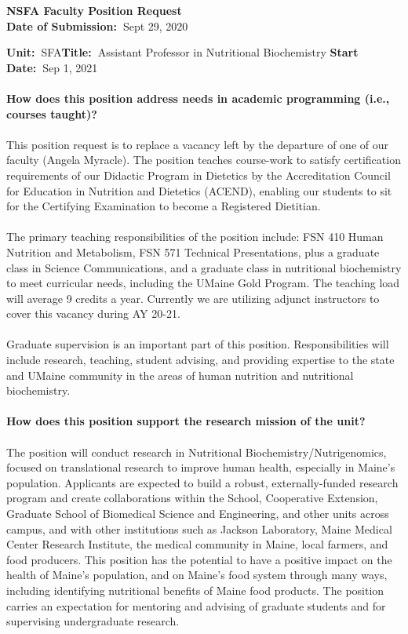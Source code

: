 \documentclass[11pt]{article}
\begin{document}
\sloppy \rmfamily
\begin{center}\textbf{NSFA Faculty Position Request\\Date of Submission:~}Sept 29, 2020\end{center}

\noindent\textbf{Unit:~}SFA\hfill\textbf{Title:~}Assistant Professor in Nutritional Biochemistry \hfill \textbf{Start Date:~}Sep 1, 2021\\~\\
\textbf{How does this position address needs in academic programming (i.e., courses taught)?}\\~\\
\small\sffamily 
This position request is to replace a vacancy left by the departure of one of our faculty (Angela Myracle). The position teaches course-work to satisfy certification requirements of our Didactic Program in Dietetics by the Accreditation Council for Education in Nutrition and Dietetics (ACEND), enabling our students to sit for the Certifying Examination to become a Registered Dietitian.
\\~\\
The primary teaching responsibilities of the position include: FSN 410 Human Nutrition and Metabolism, FSN 571 Technical Presentations, plus a graduate class in Science Communications, and a graduate class in nutritional biochemistry to meet curricular needs, including the UMaine Gold Program. The teaching load will average 9 credits a year. Currently we are utilizing adjunct instructors to cover this vacancy during AY 20-21.
\\~\\
Graduate supervision is an important part of this position. Responsibilities will include research, teaching, student advising, and providing expertise to the state and UMaine community in the areas of human nutrition and nutritional biochemistry.\\~\\
\vfill
\noindent\textbf{\rmfamily How does this position support the research mission of the unit?}\\~\\
The position will conduct research in Nutritional Biochemistry/Nutrigenomics, focused on translational  research to improve human health, especially in Maine's population. Applicants are expected to build a robust, externally-funded research program and create collaborations within the School, Cooperative Extension, Graduate School of Biomedical Science and Engineering, and other units across campus, and with other institutions such as Jackson Laboratory, Maine Medical Center Research Institute, the medical community in Maine, local farmers, and food producers. This position has the potential to have a positive impact on the health of Maine's population, and on Maine's food system through many ways, including identifying nutritional benefits of Maine food products. The position carries an expectation for mentoring and advising of graduate students and for supervising undergraduate research.
\end{document}
